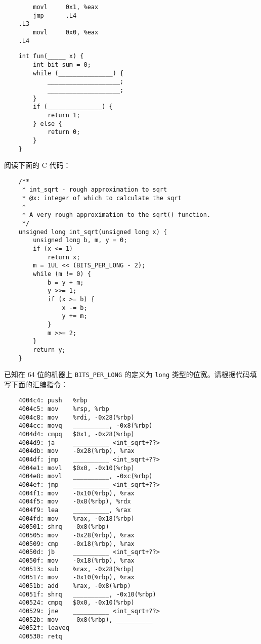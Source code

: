 \begin{problems}
\begin{verbatim}
        movl     0x1, %eax
        jmp      .L4
    .L3
        movl     0x0, %eax
    .L4 
        \end{verbatim}
        \begin{verbatim}
    int fun(_____ x) {
        int bit_sum = 0;
        while (_______________) {
            ____________________;
            ____________________;
        }
        if (_______________) {
            return 1;
        } else {
            return 0;
        }
    }
        \end{verbatim}
         阅读下面的 C 代码：
        \begin{verbatim}
    /**
     * int_sqrt - rough approximation to sqrt
     * @x: integer of which to calculate the sqrt
     *
     * A very rough approximation to the sqrt() function.
     */ 
    unsigned long int_sqrt(unsigned long x) {
        unsigned long b, m, y = 0;
        if (x <= 1) 
            return x; 
        m = 1UL << (BITS_PER_LONG - 2); 
        while (m != 0) {
            b = y + m; 
            y >>= 1; 
            if (x >= b) {
                x -= b;
                y += m; 
            } 
            m >>= 2; 
        } 
        return y; 
    } 
        \end{verbatim}
        已知在 64 位的机器上 \verb|BITS_PER_LONG| 的定义为 \verb|long| 类型的位宽。请根据代码填写下面的汇编指令：
        \begin{verbatim}
    4004c4: push   %rbp
    4004c5: mov    %rsp, %rbp
    4004c8: mov    %rdi, -0x28(%rbp)
    4004cc: movq   __________, -0x8(%rbp)
    4004d4: cmpq   $0x1, -0x28(%rbp)
    4004d9: ja     __________ <int_sqrt+??>
    4004db: mov    -0x28(%rbp), %rax
    4004df: jmp    __________ <int_sqrt+??>
    4004e1: movl   $0x0, -0x10(%rbp)
    4004e8: movl   __________, -0xc(%rbp)
    4004ef: jmp    __________ <int_sqrt+??>
    4004f1: mov    -0x10(%rbp), %rax
    4004f5: mov    -0x8(%rbp), %rdx
    4004f9: lea    __________, %rax
    4004fd: mov    %rax, -0x18(%rbp)
    400501: shrq   -0x8(%rbp)
    400505: mov    -0x28(%rbp), %rax
    400509: cmp    -0x18(%rbp), %rax
    40050d: jb     __________ <int_sqrt+??>
    40050f: mov    -0x18(%rbp), %rax
    400513: sub    %rax, -0x28(%rbp)
    400517: mov    -0x10(%rbp), %rax
    40051b: add    %rax, -0x8(%rbp)
    40051f: shrq   __________, -0x10(%rbp)
    400524: cmpq   $0x0, -0x10(%rbp)
    400529: jne    __________ <int_sqrt+??>
    40052b: mov    -0x8(%rbp), __________
    40052f: leaveq
    400530: retq

\end{verbatim}
\end{problems}
